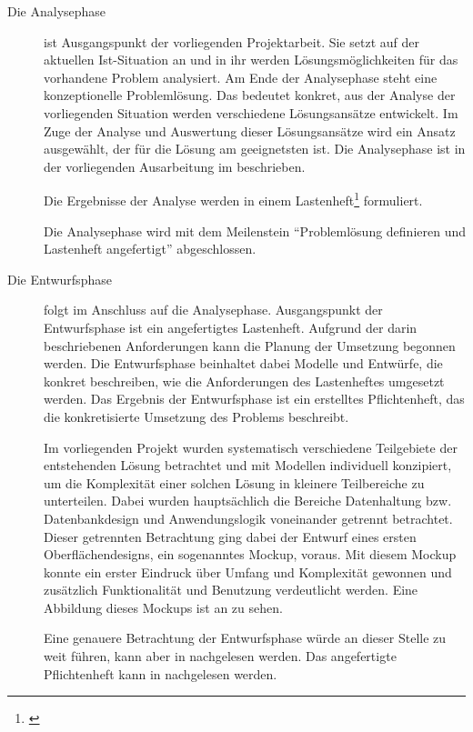 \begin{description}

  \item[Die Analysephase] ist Ausgangspunkt der vorliegenden Projektarbeit. Sie setzt
  auf der aktuellen Ist-Situation an und in ihr werden Lösungsmöglichkeiten für
  das vorhandene Problem analysiert. Am Ende der Analysephase steht eine
  konzeptionelle Problemlösung. Das bedeutet konkret, aus der Analyse der
  vorliegenden Situation werden verschiedene Lösungsansätze entwickelt. Im
  Zuge der Analyse und Auswertung dieser Lösungsansätze wird ein Ansatz
  ausgewählt, der für die Lösung am geeignetsten ist. Die Analysephase ist in
  der vorliegenden Ausarbeitung im  beschrieben.

  Die Ergebnisse der Analyse werden in einem Lastenheft\footnote{\citet{lastenheft2013}} formuliert.

  Die Analysephase wird mit dem Meilenstein "`Problemlösung definieren und
  Lastenheft angefertigt"' abgeschlossen.

  \item[Die Entwurfsphase] folgt im Anschluss auf die Analysephase.
  Ausgangspunkt der Entwurfsphase ist ein angefertigtes Lastenheft. Aufgrund der
  darin beschriebenen Anforderungen kann die Planung der Umsetzung
  begonnen werden. Die
  Entwurfsphase beinhaltet dabei Modelle und Entwürfe, 
  die konkret beschreiben, wie die
  Anforderungen des Lastenheftes umgesetzt werden. Das Ergebnis der Entwurfsphase ist ein erstelltes Pflichtenheft, das die konkretisierte Umsetzung des Problems
  beschreibt.

  Im vorliegenden Projekt wurden systematisch verschiedene Teilgebiete der
  entstehenden Lösung betrachtet und mit Modellen individuell konzipiert, um die
  Komplexität einer solchen Lösung in kleinere Teilbereiche zu unterteilen. Dabei
  wurden hauptsächlich die Bereiche Datenhaltung bzw. Datenbankdesign und
  Anwendungslogik voneinander getrennt betrachtet. Dieser getrennten Betrachtung
  ging dabei der Entwurf eines ersten Oberflächendesigns, ein sogenanntes
  Mockup, voraus. Mit diesem Mockup konnte ein erster Eindruck über Umfang und
  Komplexität gewonnen und zusätzlich Funktionalität und Benutzung
  verdeutlicht werden. Eine Abbildung dieses Mockups ist an  zu
  sehen.

  Eine genauere Betrachtung der Entwurfsphase würde an dieser Stelle zu weit führen,
  kann aber in \citet{modelierungUndBetrieb2014} nachgelesen werden.
  Das angefertigte Pflichtenheft kann in \citet{pflichtenheft2013} nachgelesen werden.


\end{description}
